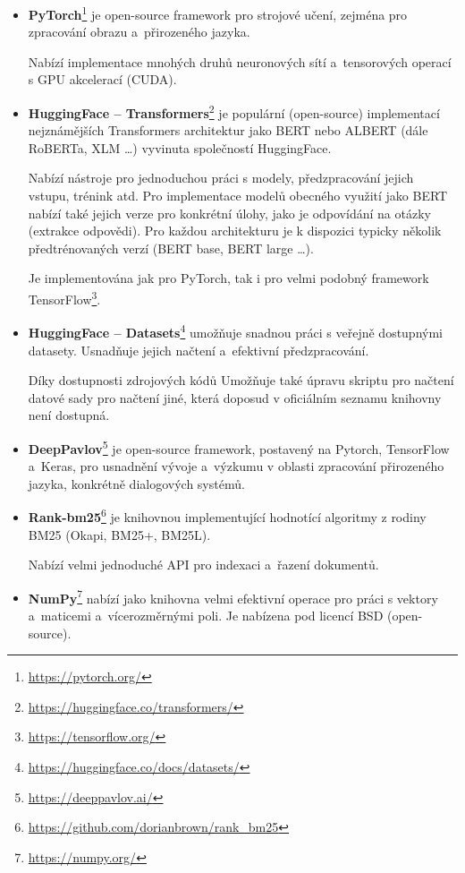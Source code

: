 \begin{itemize}
    \item \textbf{PyTorch}\footnote{\url{https://pytorch.org/}}
    je open-source framework pro strojové učení, zejména pro zpracování obrazu a~přirozeného jazyka. \par
    Nabízí implementace mnohých druhů neuronových sítí a~tensorových operací s GPU akcelerací (CUDA).
    
    \item \textbf{HuggingFace -- Transformers}\footnote{\url{https://huggingface.co/transformers/}}
    je populární (open-source) implementací nejznámějších Transformers architektur jako BERT nebo ALBERT (dále RoBERTa, XLM \dots) vyvinuta společností HuggingFace.\par
    Nabízí nástroje pro jednoduchou práci s modely, předzpracování jejich vstupu, trénink atd. Pro implementace modelů obecného využití jako BERT nabízí také jejich verze pro konkrétní úlohy, jako je odpovídání na otázky (extrakce odpovědi). Pro každou architekturu je k dispozici typicky několik předtrénovaných verzí (BERT base, BERT large \dots).\par
    Je implementována jak pro PyTorch, tak i pro velmi podobný framework TensorFlow\footnote{\url{https://tensorflow.org/}}.
    
    \item \textbf{HuggingFace -- Datasets}\footnote{\url{https://huggingface.co/docs/datasets/}}
    umožňuje snadnou práci s veřejně dostupnými datasety. Usnadňuje jejich načtení a~efektivní předzpracování.\par 
    Díky dostupnosti zdrojových kódů Umožňuje také úpravu skriptu pro načtení datové sady pro načtení jiné, která doposud v oficiálním seznamu knihovny není dostupná.
    
    \item \textbf{DeepPavlov}\footnote{\url{https://deeppavlov.ai/}}
    je open-source framework, postavený na Pytorch, TensorFlow a~Keras, pro usnadnění vývoje a~výzkumu v oblasti zpracování přirozeného jazyka, konkrétně dialogových systémů.
    
    \item \textbf{Rank-bm25}\footnote{\url{https://github.com/dorianbrown/rank\_bm25}}
    je knihovnou implementující hodnotící algoritmy z rodiny BM25 \cite{bm25_improvements} (Okapi, BM25+, BM25L).\par
    Nabízí velmi jednoduché API pro indexaci a~řazení dokumentů.
    
    \item \textbf{NumPy}\footnote{\url{https://numpy.org/}}
    nabízí jako knihovna velmi efektivní operace pro práci s vektory a~maticemi a~vícerozměrnými poli. Je nabízena pod licencí BSD (open-source).
    

\end{itemize}
